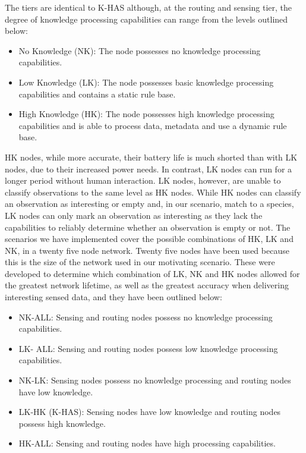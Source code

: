	The tiers are identical to K-HAS although, at the routing and sensing tier, the degree of knowledge processing capabilities can range from the levels outlined below:
	
	\begin{itemize}
		\item No Knowledge (NK): The node possesses no knowledge processing capabilities.
		\item Low Knowledge (LK): The node possesses basic knowledge processing capabilities and contains a static rule base.
		\item High Knowledge (HK): The node possesses high knowledge processing capabilities and is able to process data, metadata and use a dynamic rule base.
	\end{itemize}
	
	HK nodes, while more accurate, their battery life is much shorted than with LK nodes, due to their increased power needs. In contrast, LK nodes can run for a longer period without human interaction. LK nodes, however, are unable to classify observations to the same level as HK nodes. While HK nodes can classify an observation as interesting or empty and, in our scenario, match to a species, LK nodes can only mark an observation as interesting as they lack the capabilities to reliably determine whether an observation is empty or not. The scenarios we have implemented cover the possible combinations of HK, LK and NK, in a twenty five node network. Twenty five nodes have been used because this is the size of the network used in our motivating scenario. These were developed to determine which combination of LK, NK and HK nodes allowed for the greatest network lifetime, as well as the greatest accuracy when delivering interesting sensed data, and they have been outlined below:
	
	\begin{itemize}
		\item NK-ALL: Sensing and routing nodes possess no knowledge processing capabilities.
		\item LK- ALL: Sensing and routing nodes possess low knowledge processing capabilities.
		\item NK-LK: Sensing nodes possess no knowledge processing and routing nodes have low knowledge.
		\item LK-HK (K-HAS): Sensing nodes have low knowledge and routing nodes possess high knowledge.
		\item HK-ALL: Sensing and routing nodes have high processing capabilities.
	\end{itemize}

